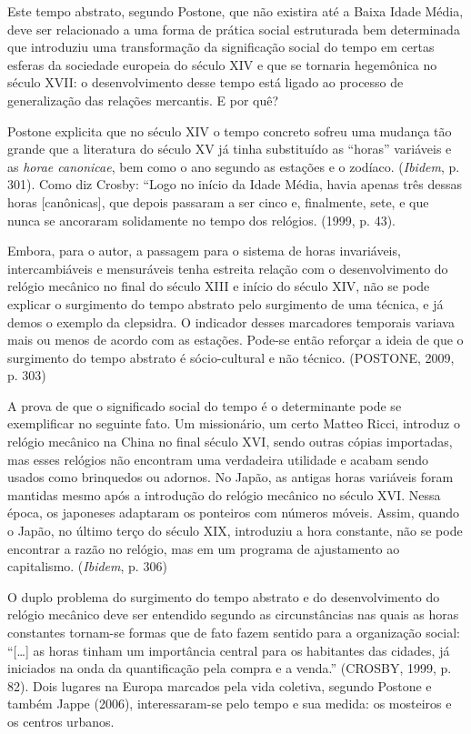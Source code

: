 Este tempo abstrato, segundo Postone, que não existira até a Baixa Idade
Média, deve ser relacionado a uma forma de prática social estruturada
bem determinada que introduziu uma transformação da significação social
do tempo em certas esferas da sociedade europeia do século XIV e que se
tornaria hegemônica no século XVII: o desenvolvimento desse tempo está
ligado ao processo de generalização das relações mercantis. E por quê?

Postone explicita que no século XIV o tempo concreto sofreu uma mudança
tão grande que a literatura do século XV já tinha substituído as
``horas'' variáveis e as \emph{horae canonicae}, bem como o ano segundo
as estações e o zodíaco. (\emph{Ibidem}, p. 301). Como diz Crosby:
``Logo no início da Idade Média, havia apenas três dessas horas
{[}canônicas{]}, que depois passaram a ser cinco e, finalmente, sete, e
que nunca se ancoraram solidamente no tempo dos relógios. (1999, p. 43).

Embora, para o autor, a passagem para o sistema de horas invariáveis,
intercambiáveis e mensuráveis tenha estreita relação com o
desenvolvimento do relógio mecânico no final do século XIII e início do
século XIV, não se pode explicar o surgimento do tempo abstrato pelo
surgimento de uma técnica, e já demos o exemplo da clepsidra. O
indicador desses marcadores temporais variava mais ou menos de acordo
com as estações. Pode-se então reforçar a ideia de que o surgimento do
tempo abstrato é sócio-cultural e não técnico. (POSTONE, 2009, p. 303)

A prova de que o significado social do tempo é o determinante pode se
exemplificar no seguinte fato. Um missionário, um certo Matteo Ricci,
introduz o relógio mecânico na China no final século XVI, sendo outras
cópias importadas, mas esses relógios não encontram uma verdadeira
utilidade e acabam sendo usados como brinquedos ou adornos. No Japão, as
antigas horas variáveis foram mantidas mesmo após a introdução do
relógio mecânico no século XVI. Nessa época, os japoneses adaptaram os
ponteiros com números móveis. Assim, quando o Japão, no último terço do
século XIX, introduziu a hora constante, não se pode encontrar a razão
no relógio, mas em um programa de ajustamento ao capitalismo.
(\emph{Ibidem}, p. 306)

O duplo problema do surgimento do tempo abstrato e do desenvolvimento do
relógio mecânico deve ser entendido segundo as circunstâncias nas quais
as horas constantes tornam-se formas que de fato fazem sentido para a
organização social: ``{[}\ldots{}{]} as horas tinham um importância
central para os habitantes das cidades, já iniciados na onda da
quantificação pela compra e a venda.'' (CROSBY, 1999, p. 82). Dois
lugares na Europa marcados pela vida coletiva, segundo Postone e também
Jappe (2006), interessaram-se pelo tempo e sua medida: os mosteiros e os
centros urbanos.

